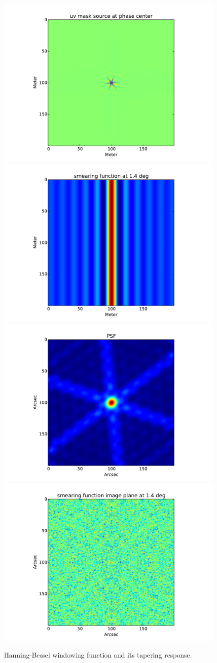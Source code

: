 \begin{figure}
\includegraphics[width=.5\textwidth]{./Figures/uv.pdf}%
\includegraphics[width=.5\textwidth]{./Figures/smearing_uv.pdf}
\includegraphics[width=.5\textwidth]{./Figures/psf.pdf}%
\includegraphics[width=.5\textwidth]{./Figures/smearing_imagePlane.pdf}
\caption{Hanning-Bessel windowing function and its tapering response.}\label{fig:wf:bessel-han}
\end{figure}
